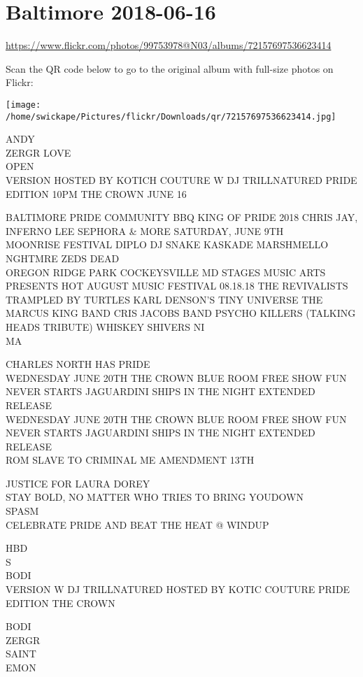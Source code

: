 \documentclass[10pt,letterpaper]{article}
\begin{document}
\section*{Baltimore 2018-06-16}

\url{https://www.flickr.com/photos/99753978@N03/albums/72157697536623414}

Scan the QR code below to go to the original album with full-size photos on Flickr:

\texttt{[image: /home/swickape/Pictures/flickr/Downloads/qr/72157697536623414.jpg]}


ANDY\\
ZERGR LOVE\\
OPEN\\
VERSION HOSTED BY KOTICH COUTURE W DJ TRILLNATURED PRIDE EDITION 10PM THE CROWN JUNE 16

BALTIMORE PRIDE COMMUNITY BBQ KING OF PRIDE 2018 CHRIS JAY, INFERNO LEE SEPHORA \& MORE SATURDAY, JUNE 9TH\\
MOONRISE FESTIVAL DIPLO DJ SNAKE KASKADE MARSHMELLO NGHTMRE ZEDS DEAD\\
OREGON RIDGE PARK COCKEYSVILLE MD STAGES MUSIC ARTS PRESENTS HOT AUGUST MUSIC FESTIVAL 08.18.18 THE REVIVALISTS TRAMPLED BY TURTLES KARL DENSON'S TINY UNIVERSE THE MARCUS KING BAND CRIS JACOBS BAND PSYCHO KILLERS (TALKING HEADS TRIBUTE) WHISKEY SHIVERS NI\\
MA

CHARLES NORTH HAS PRIDE\\
WEDNESDAY JUNE 20TH THE CROWN BLUE ROOM FREE SHOW FUN NEVER STARTS JAGUARDINI SHIPS IN THE NIGHT EXTENDED RELEASE\\
WEDNESDAY JUNE 20TH THE CROWN BLUE ROOM FREE SHOW FUN NEVER STARTS JAGUARDINI SHIPS IN THE NIGHT EXTENDED RELEASE\\
ROM SLAVE TO CRIMINAL ME AMENDMENT 13TH

JUSTICE FOR LAURA DOREY\\
STAY BOLD, NO MATTER WHO TRIES TO BRING YOUDOWN\\
SPASM\\
CELEBRATE PRIDE AND BEAT THE HEAT @ WINDUP

HBD\\
S\\
BODI\\
VERSION W DJ TRILLNATURED HOSTED BY KOTIC COUTURE PRIDE EDITION THE CROWN

BODI\\
ZERGR\\
SAINT\\
EMON
\end{document}
